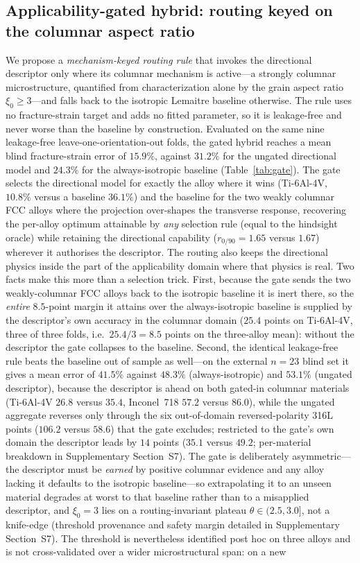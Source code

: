 \subsection{Applicability-gated hybrid: routing keyed on the columnar aspect ratio}
\label{sec:gated_hybrid}

We propose a \emph{mechanism-keyed routing rule} that invokes the directional descriptor only where its columnar mechanism is active---a strongly columnar microstructure, quantified from characterization alone by the grain aspect ratio $\xi_0\ge3$---and falls back to the isotropic Lemaitre baseline otherwise. The rule uses no fracture-strain target and adds no fitted parameter, so it is leakage-free and never worse than the baseline by construction. Evaluated on the same nine leakage-free leave-one-orientation-out folds, the gated hybrid reaches a mean blind fracture-strain error of $15.9\%$, against $31.2\%$ for the ungated directional model and $24.3\%$ for the always-isotropic baseline (Table~\ref{tab:gate}). The gate selects the directional model for exactly the alloy where it wins (Ti-6Al-4V, $10.8\%$ versus a baseline $36.1\%$) and the baseline for the two weakly columnar FCC alloys where the projection over-shapes the transverse response, recovering the per-alloy optimum attainable by \emph{any} selection rule (equal to the hindsight oracle) while retaining the directional capability ($r_{0/90}=1.65$ versus $1.67$) wherever it authorises the descriptor. The routing also keeps the directional physics inside the part of the applicability domain where that physics is real. Two facts make this more than a selection trick. First, because the gate sends the two weakly-columnar FCC alloys back to the isotropic baseline it is inert there, so the \emph{entire} $8.5$-point margin it attains over the always-isotropic baseline is supplied by the descriptor's own accuracy in the columnar domain ($25.4$ points on Ti-6Al-4V, three of three folds, i.e.\ $25.4/3=8.5$ points on the three-alloy mean): without the descriptor the gate collapses to the baseline. Second, the identical leakage-free rule beats the baseline out of sample as well---on the external $n=23$ blind set it gives a mean error of $41.5\%$ against $48.3\%$ (always-isotropic) and $53.1\%$ (ungated descriptor), because the descriptor is ahead on both gated-in columnar materials (Ti-6Al-4V $26.8$ versus $35.4$, Inconel~718 $57.2$ versus $86.0$), while the ungated aggregate reverses only through the six out-of-domain reversed-polarity 316L points ($106.2$ versus $58.6$) that the gate excludes; restricted to the gate's own domain the descriptor leads by $14$ points ($35.1$ versus $49.2$; per-material breakdown in Supplementary Section~S7). The gate is deliberately asymmetric---the descriptor must be \emph{earned} by positive columnar evidence and any alloy lacking it defaults to the isotropic baseline---so extrapolating it to an unseen material degrades at worst to that baseline rather than to a misapplied descriptor, and $\xi_0=3$ lies on a routing-invariant plateau $\theta\in(2.5,3.0]$, not a knife-edge (threshold provenance and safety margin detailed in Supplementary Section~S7). The threshold is nevertheless identified post hoc on three alloys and is not cross-validated over a wider microstructural span: on a new 